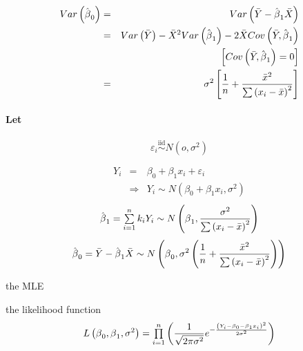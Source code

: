 \documentclass{article}
\begin{document}
\bigskip 

\begin{eqnarray*}
Var\left( \hat{\beta}_{0}\right)  &=&Var\left( \bar{Y}-\hat{\beta}_{1}\bar{X}%
\right)  \\
&=&Var\left( \bar{Y}\right) -\bar{X}^{2}Var\left( \hat{\beta}_{1}\right) -2%
\bar{X}Cov\left( \bar{Y},\hat{\beta}_{1}\right)  \\
&&\left[ Cov\left( \bar{Y},\hat{\beta}_{1}\right) =0\right]  \\
&=&\sigma ^{2}\left[ \frac{1}{n}+\frac{\bar{x}^{2}}{\tsum \left( x_{i}-\bar{x%
}\right) ^{2}}\right] 
\end{eqnarray*}

\bigskip 

\paragraph{Let}

\begin{equation*}
\varepsilon _{i}\overset{\text{iid}}{\sim }N\left( o,\sigma ^{2}\right) 
\end{equation*}

\begin{eqnarray*}
Y_{i} &=&\beta _{0}+\beta _{1}x_{i}+\varepsilon _{i} \\
&\Rightarrow &Y_{i}\sim N\left( \beta _{0}+\beta _{1}x_{i},\sigma
^{2}\right) 
\end{eqnarray*}%
\begin{equation*}
\hat{\beta}_{1}=\tsum\limits_{i=1}^{n}k_{i}Y_{i}\sim N\left( \beta _{1},%
\frac{\sigma ^{2}}{\tsum \left( x_{i}-\bar{x}\right) ^{2}}\right) 
\end{equation*}%
\begin{equation*}
\hat{\beta}_{0}=\bar{Y}-\hat{\beta}_{1}\bar{X}\sim N\left( \beta _{0},\sigma
^{2}\left( \frac{1}{n}+\frac{\bar{x}^{2}}{\tsum \left( x_{i}-\bar{x}\right)
^{2}}\right) \right) 
\end{equation*}

\bigskip 

the MLE

the likelihood function%
\begin{equation*}
L\left( \beta _{0},\beta _{1},\sigma ^{2}\right)
=\tprod\limits_{i=1}^{n}\left( \frac{1}{\sqrt{2\pi \sigma ^{2}}}e^{-\frac{%
\left( Y_{i}-\beta _{0}-\beta _{1}x_{i}\right) ^{2}}{2\sigma ^{2}}}\right) 
\end{equation*}
\end{document}
